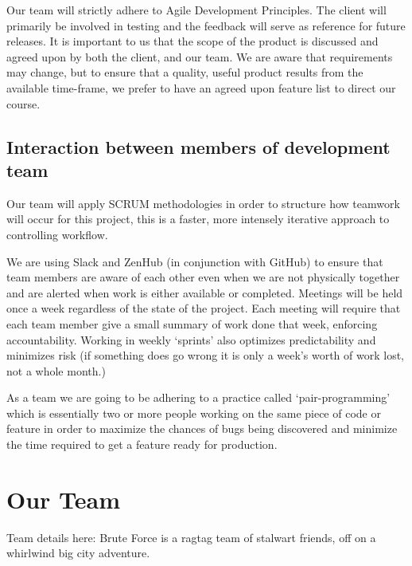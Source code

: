 \documentclass[12pt,a4paper]{article}
\begin{document}
   Our team will strictly adhere to Agile Development Principles. The client will primarily be involved in testing and the feedback will serve as reference for future releases. It is important to us that the scope of the product
   is discussed and agreed upon by both the client, and our team. We are aware that requirements may change, but to ensure that a quality, useful product results from the available time-frame, we prefer to have an agreed upon
   feature list to direct our course.

   \subsection{Interaction between members of development team}
   Our team will apply SCRUM methodologies in order to structure how teamwork will occur for this project, this is a faster, more intensely iterative approach to controlling workflow.

   We are using Slack and ZenHub (in conjunction with GitHub) to ensure that team members are aware of each other even when we are not physically together and are alerted when work is either available or completed.
	Meetings will be held once a week regardless of the state of the project. Each meeting will require that each team member give a small summary of work done that week, enforcing accountability.
   Working in weekly `sprints' also optimizes predictability and minimizes risk (if something does go wrong it is only a week's worth of work lost, not a whole month.)

   As a team we are going to be adhering to a practice called `pair-programming' which is essentially two or more people working on the same piece of code or feature in order to maximize the chances of bugs
   being discovered and minimize the time required to get a feature ready for production.

   \section{Our Team}
   Team details here:
   Brute Force is a ragtag team of stalwart friends, off on a whirlwind big city adventure.
\end{document}
